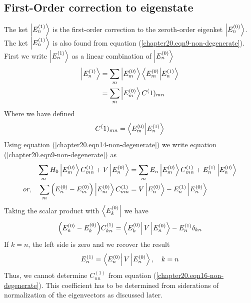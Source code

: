 \subsection{First-Order correction to eigenstate}
The ket $\ket{E_{n}^{(1)}}$ is the first-order correction to the zeroth-order eigenket $\ket{E_{n}^{(0)}}$. The ket $\ket{E_{n}^{(1)}}$ is also found from equation (\ref{chapter20.eqn9-non-degenerate}). First we write $\ket{E_{n}^{(1)}}$ as a linear combination of $\ket{E_{n}^{(0)}}$
\begin{align}
\label{chapter20.eqn13-non-degenerate}
\ket{E_{n}^{(1)}} 
&= \sum_{m} \ket{E_{m}^{(0)}} \braket{E_m^{(0)}}{E_n^{(1)}} \\
\label{chapter20.eqn14-non-degenerate}
&= \sum_{m} \ket{E_{m}^{(0)}} C^(1)_{m n}
\end{align}
Where we have defined
\begin{equation}
C^(1)_{m n} = \braket{E_m^{(0)}}{E_n^{(1)}}
\label{chapter20.eqn15-non-degenerate}
\end{equation}
Using equation (\ref{chapter20.eqn14-non-degenerate}) we write equation (\ref{chapter20.eqn9-non-degenerate}) as
\begin{align*}
	\sum_{m} H_0 \ket{E_{m}^{(0)}} C^{(1)}_{m n} + V \ket{E_{n}^{(0)}} 
	&= \sum_{m} E_n \ket{E_{m}^{(0)}} C^{(1)}_{m n} + E_{n}^{(1)} \ket{E_{n}^{(0)}} \\
	or, \quad 
	\sum_{m} \qty(E_{n}^{(0)}  -  E_{m}^{(0)}) \ket{E_{m}^{(0)}} C^{(1)}_{m n} 
	&= V \ket{E_n^{(0)}} - E_{n}^{(1)} \ket{E_{n}^{(0)}}
\end{align*}
Taking the scalar product with $\bra{E_k^{(0)}}$ we have
\begin{equation}
\qty(E_n^{(0)} - E_k^{(0)}) C^{(1)}_{k n} = \bra{E_k^{(0)}} V \ket{E_n^{(0)}} - E_n^{(1)} \delta_{k n}
\label{chapter20.eqn16-non-degenerate}
\end{equation}
If $k=n$, the left side is zero and we recover the result
\begin{equation}
E_n^{(1)}  = \bra{E_n^{(0)}} V \ket{E_n^{(0)}} , \quad k = n
\end{equation}
Thus, we cannot determine $C^{(1)}_{n n}$ from equation (\ref{chapter20.eqn16-non-degenerate}). This coefficient has to be determined from siderations of normalization of the eigenvectors as discussed later.\\

